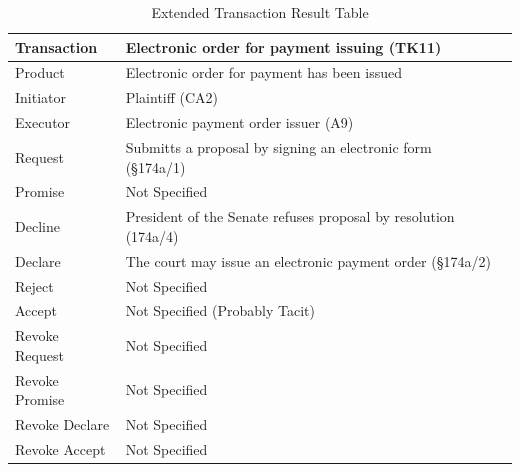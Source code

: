 \begin{landscape}
\begin{table}[h]
\caption{Extended Transaction Result Table}
\label{tab:etrt}
\begin{tabular}{|l||l|l|}
\hline
Transaction  &  Electronic order for payment issuing (TK11) \\ \hline
Product      &  Electronic order for payment has been issued \\ \hline
Initiator      & Plaintiff (CA2) \\ \hline
Executor       &  Electronic payment order issuer (A9) \\ \hline
Request        & Submitts a proposal by signing an electronic form (\S174a/1)
  \\ \hline
Promise        &    Not Specified   \\ \hline
Decline        & President of the Senate refuses proposal by resolution (174a/4)  \\ \hline
Declare        &  The court may issue an electronic payment order (\S174a/2)  \\ \hline
Reject         &  Not Specified   \\ \hline
Accept         & Not Specified (Probably Tacit) \\ \hline
Revoke Request & Not Specified \\ \hline
Revoke Promise & Not Specified  \\ \hline
Revoke Declare & Not Specified      \\ \hline
Revoke Accept  &  Not Specified \\ \hline
\end{tabular}
\end{table}


\end{landscape}
